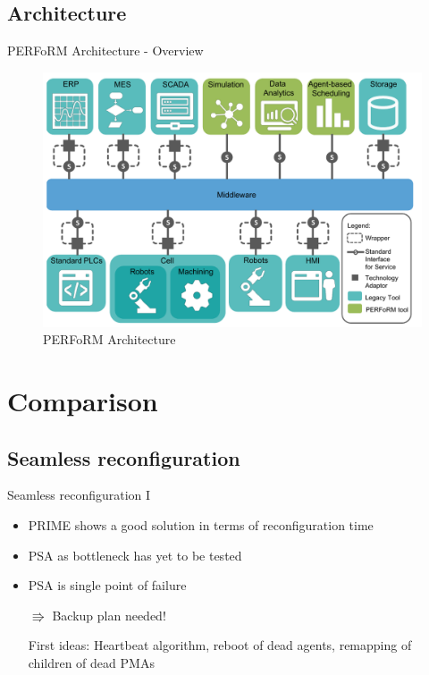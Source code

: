 \documentclass[12pt]{beamer}
\begin{document}
\subsection{Architecture}

\begin{frame}{PERFoRM Architecture - Overview}
	\begin{figure}
		\includegraphics[scale=0.25]{Specification-PERFoRM/PERFoRM-Architecture}
		\caption{PERFoRM Architecture \cite{Perform}}
	\end{figure}
\end{frame}

\section{Comparison}

\subsection{Seamless reconfiguration}
\begin{frame}{Seamless reconfiguration I}
	\begin{itemize}
		\item PRIME shows a good solution in terms of reconfiguration time
		\newline
		
		\item PSA as bottleneck has yet to be tested
		\newline
		
		\item PSA is single point of failure
		\newline
		
		$\Rrightarrow$ Backup plan needed!
		\newline
		
		First ideas: Heartbeat algorithm, reboot of dead agents, remapping of children of dead PMAs
	\end{itemize}
\end{frame}
\end{document}
